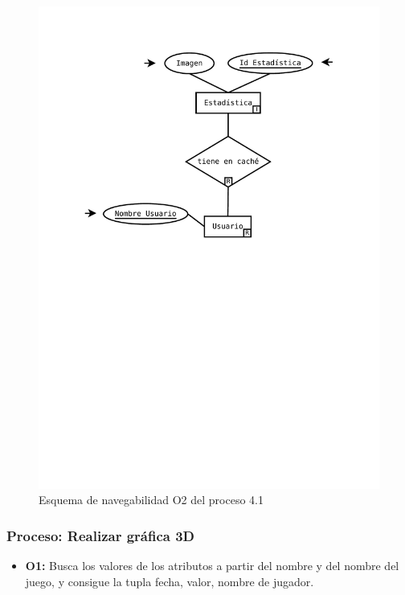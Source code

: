 \begin{figure}[H]
	\centering
	\includegraphics[width=0.5\linewidth]{../Diagramas/pdf/OpEstadisticas1-2.pdf}
	\caption{Esquema de navegabilidad  O2 del proceso 4.1}
	
	\label{fig:O4.12}
\end{figure}

\subsubsection{Proceso: Realizar gráfica 3D}

\begin{itemize}
	\item \textbf{O1:} Busca los valores de los atributos a partir del nombre y del nombre del juego, y consigue la tupla fecha, valor, nombre de jugador.
\end{itemize}

